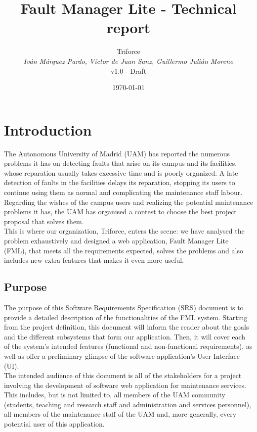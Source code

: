 \documentclass{report}
\title{Fault Manager Lite - Technical report}
\date{\today}
\author{{\Large Triforce} \\ \vspace{5pt} \textit{Iván Márquez Pardo, Víctor de Juan Sanz, Guillermo Julián Moreno} \\ v1.0 - Draft}
\begin{document}
\maketitle

\begin{abstract}

\end{abstract}
\tableofcontents
\newpage
\pagestyle{plain}

\chapter{Introduction}

The Autonomous University of Madrid (UAM) has reported the numerous problems it has on detecting faults that arise on its campus and its facilities, whose reparation usually takes excessive time and is poorly organized. A late detection of faults in the facilities delays its reparation, stopping its users to continue using them as normal and complicating the maintenance staff labour. Regarding the wishes of the campus users and realizing the potential maintenance problems it has, the UAM has organised a contest to choose the best project proposal that solves them.\\
This is where our organization, Triforce, enters the scene: we have analysed the problem exhaustively and designed a web application, Fault Manager Lite (FML), that meets all the requirements expected, solves the problems and also includes new extra features that makes it even more useful.

\section{Purpose} The purpose of this Software Requirements Specification (SRS) document is to provide a detailed description of the functionalities of the FML system. Starting from the project definition, this document will inform the reader about the goals and the different subsystems that form our application. Then, it will cover each of the system's intended features (functional and non-functional requirements), as well as offer a preliminary glimpse of the software application's User Interface (UI).\\

The intended audience of this document is all of the stakeholders for a project involving the development of software web application for maintenance services. This includes, but is not limited to, all members of the UAM community (students, teaching
and research staff and administration and services personnel), all members of the maintenance staff of the UAM and, more generally, every potential user of this application.
\end{document}
